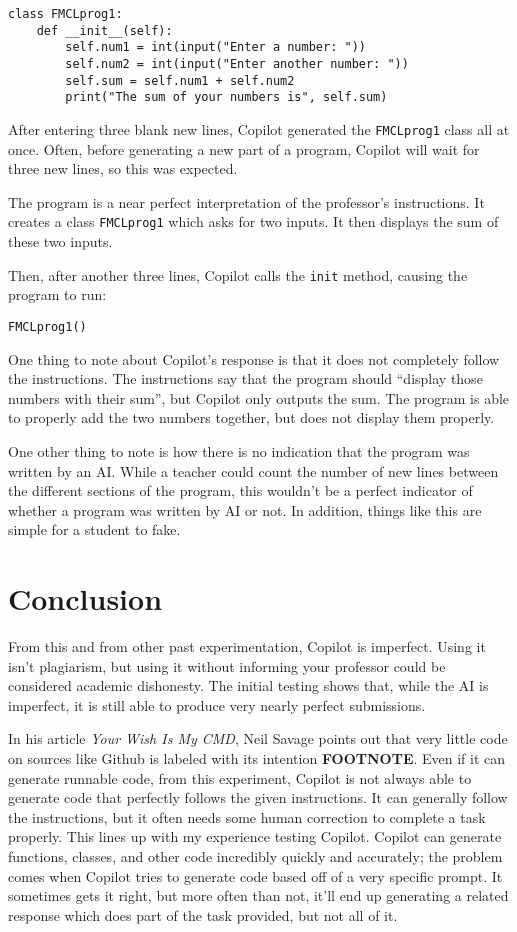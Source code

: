 \documentclass[12pt]{article}
\begin{document}
\begin{lstlisting}
class FMCLprog1:
    def __init__(self):
        self.num1 = int(input("Enter a number: "))
        self.num2 = int(input("Enter another number: "))
        self.sum = self.num1 + self.num2
        print("The sum of your numbers is", self.sum)
\end{lstlisting} 

After entering three blank new lines, Copilot generated the
\texttt{FMCLprog1} class all at once. Often, before generating a new
part of a program, Copilot will wait for three new lines, so this was
expected.

The program is a near perfect interpretation of the professor's
instructions. It creates a class \texttt{FMCLprog1} which asks for two
inputs. It then displays the sum of these two inputs.

Then, after another three lines, Copilot calls the \texttt{init} method,
causing the program to run:

\begin{lstlisting}
FMCLprog1()
\end{lstlisting}

One thing to note about Copilot's response is that it does not
completely follow the instructions. The instructions say that the
program should ``display those numbers with their sum'', but Copilot
only outputs the sum. The program is able to properly add the two
numbers together, but does not display them properly.

One other thing to note is how there is no indication that the program
was written by an AI. While a teacher could count the number of new
lines between the different sections of the program, this wouldn't be a
perfect indicator of whether a program was written by AI or not. In
addition, things like this are simple for a student to fake.

\hypertarget{conclusion}{%
\section{Conclusion}\label{conclusion}}

From this and from other past experimentation, Copilot is imperfect.
Using it isn't plagiarism, but using it without informing your professor
could be considered academic dishonesty. The initial testing shows that,
while the AI is imperfect, it is still able to produce very nearly
perfect submissions.

In his article \emph{Your Wish Is My CMD}, Neil Savage points out that
very little code on sources like Github is labeled with its intention
\textbf{FOOTNOTE}. Even if it can generate runnable code, from this
experiment, Copilot is not always able to generate code that perfectly
follows the given instructions. It can generally follow the
instructions, but it often needs some human correction to complete a
task properly. This lines up with my experience testing Copilot. Copilot
can generate functions, classes, and other code incredibly quickly and
accurately; the problem comes when Copilot tries to generate code based
off of a very specific prompt. It sometimes gets it right, but more
often than not, it'll end up generating a related response which does
part of the task provided, but not all of it.
\end{document}
